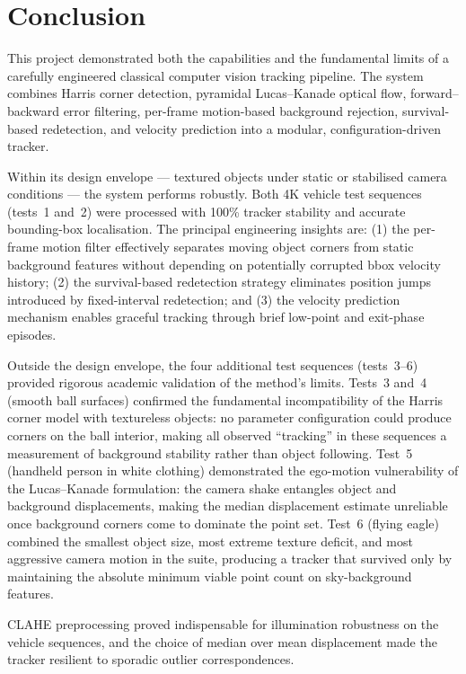 \documentclass[12pt,a4paper]{article}
\begin{document}
\section{Conclusion}

This project demonstrated both the capabilities and the fundamental limits of a carefully
engineered classical computer vision tracking pipeline. The system combines Harris corner
detection, pyramidal Lucas--Kanade optical flow, forward--backward error filtering, per-frame
motion-based background rejection, survival-based redetection, and velocity prediction into a
modular, configuration-driven tracker.

Within its design envelope --- textured objects under static or stabilised camera conditions ---
the system performs robustly. Both 4K vehicle test sequences (tests~1 and~2) were processed with
100\% tracker stability and accurate bounding-box localisation. The principal engineering insights
are: (1) the per-frame motion filter effectively separates moving object corners from static
background features without depending on potentially corrupted bbox velocity history; (2) the
survival-based redetection strategy eliminates position jumps introduced by fixed-interval
redetection; and (3) the velocity prediction mechanism enables graceful tracking through brief
low-point and exit-phase episodes.

Outside the design envelope, the four additional test sequences (tests~3--6) provided rigorous
academic validation of the method's limits. Tests~3 and~4 (smooth ball surfaces) confirmed the
fundamental incompatibility of the Harris corner model with textureless objects: no parameter
configuration could produce corners on the ball interior, making all observed ``tracking'' in
these sequences a measurement of background stability rather than object following. Test~5
(handheld person in white clothing) demonstrated the ego-motion vulnerability of the Lucas--Kanade
formulation: the camera shake entangles object and background displacements, making the median
displacement estimate unreliable once background corners come to dominate the point set.
Test~6 (flying eagle) combined the smallest object size, most extreme texture deficit, and most
aggressive camera motion in the suite, producing a tracker that survived only by maintaining
the absolute minimum viable point count on sky-background features.

CLAHE preprocessing proved indispensable for illumination robustness on the vehicle sequences,
and the choice of median over mean displacement made the tracker resilient to sporadic outlier
correspondences.
\end{document}
